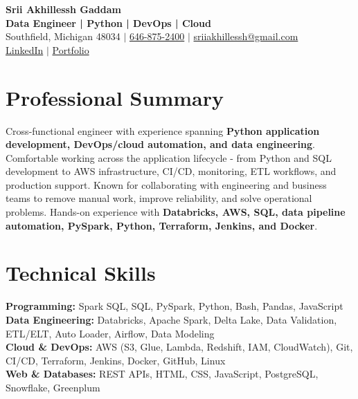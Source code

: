 \documentclass[letterpaper,10pt]{article}
\begin{document}
\fontsize{9.35pt}{10.45pt}\selectfont

\begin{center}
    {\LARGE \textbf{Srii Akhillessh Gaddam}} \\[-1pt]
    \textbf{Data Engineer | Python | DevOps | Cloud} \\[2pt]
    Southfield, Michigan 48034 $|$
    \href{tel:6468752400}{646-875-2400} $|$
    \href{mailto:sriiakhillessh@gmail.com}{sriiakhillessh@gmail.com} \\[1pt]
    \href{https://www.linkedin.com/in/srii-akhiilessh-gaddam-b48668191/}{LinkedIn} $|$
    \href{https://sriiakhillesshg.github.io/portfolio/}{Portfolio}
\end{center}
\vspace{-8pt}

\section{Professional Summary}
\small{Cross-functional engineer with experience spanning \textbf{Python application development, DevOps/cloud automation, and data engineering}. Comfortable working across the application lifecycle - from Python and SQL development to AWS infrastructure, CI/CD, monitoring, ETL workflows, and production support. Known for collaborating with engineering and business teams to remove manual work, improve reliability, and solve operational problems. Hands-on experience with \textbf{Databricks, AWS, SQL, data pipeline automation, PySpark, Python, Terraform, Jenkins, and Docker}.}

\section{Technical Skills}
\small{
\textbf{Programming:} Spark SQL, SQL, PySpark, Python, Bash, Pandas, JavaScript \\
\textbf{Data Engineering:} Databricks, Apache Spark, Delta Lake, Data Validation, ETL/ELT, Auto Loader, Airflow, Data Modeling \\
\textbf{Cloud \& DevOps:} AWS (S3, Glue, Lambda, Redshift, IAM, CloudWatch), Git, CI/CD, Terraform, Jenkins, Docker, GitHub, Linux \\
\textbf{Web \& Databases:} REST APIs, HTML, CSS, JavaScript, PostgreSQL, Snowflake, Greenplum
}

\end{document}
